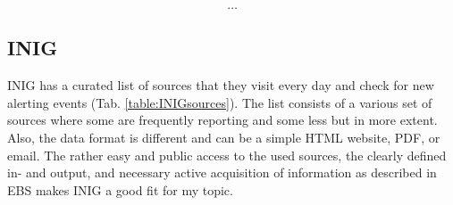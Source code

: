 \[\dots\]

\subsection{INIG}\label{INIGsources}
  INIG has a curated list of sources that they visit every day and check for new alerting events (Tab. \ref{table:INIGsources}).
  The list consists of a various set of sources where some are frequently reporting and some less but in more extent.
  Also, the data format is different and can be a simple HTML website, PDF, or email.
  The rather easy and public access to the used sources, the clearly defined in- and output, and necessary active acquisition of information as described in EBS makes INIG a good fit for my topic.




